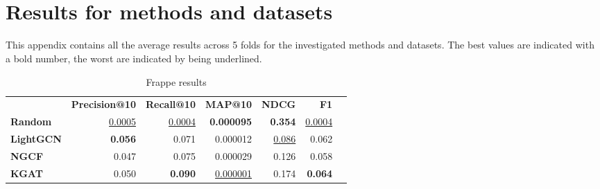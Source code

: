 \section{\\Results for methods and datasets}
This appendix contains all the average results across 5 folds for the investigated methods and datasets.
The best values are indicated with a bold number, the worst are indicated by being underlined.


\begin{table}[!htp]\centering
\caption{Frappe results}\label{tab:frappetable}
\scriptsize
\begin{tabular}{lrrrrrr}\toprule
&\textbf{Precision@10} &\textbf{Recall@10} &\textbf{MAP@10} &\textbf{NDCG} &\textbf{F1} \\\cmidrule{2-6}
\textbf{Random} &\ul{0.0005} &\ul{0.0004} &\textbf{0.000095} &\textbf{0.354} &\ul{0.0004} \\\cmidrule{1-6}
\textbf{LightGCN} &\textbf{0.056} &0.071 &0.000012 &\ul{0.086} &0.062 \\\cmidrule{1-6}
\textbf{NGCF} &0.047 &0.075 &0.000029 &0.126 &0.058 \\\midrule
\textbf{KGAT} &0.050 &\textbf{0.090} &\ul{0.000001} &0.174 &\textbf{0.064} \\
\bottomrule
\end{tabular}
\end{table}

